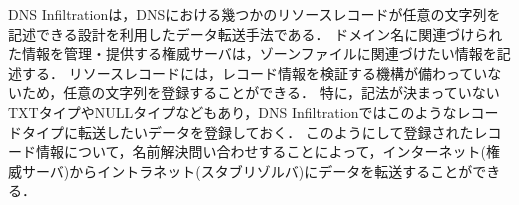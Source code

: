 DNS Infiltrationは，DNSにおける幾つかのリソースレコードが任意の文字列を記述できる設計を利用したデータ転送手法である．
ドメイン名に関連づけられた情報を管理・提供する権威サーバは，ゾーンファイルに関連づけたい情報を記述する．
リソースレコードには，レコード情報を検証する機構が備わっていないため，任意の文字列を登録することができる．
特に，記法が決まっていないTXTタイプやNULLタイプなどもあり，DNS Infiltrationではこのようなレコードタイプに転送したいデータを登録しておく．
このようにして登録されたレコード情報について，名前解決問い合わせすることによって，インターネット(権威サーバ)からイントラネット(スタブリゾルバ)にデータを転送することができる．
%
%

